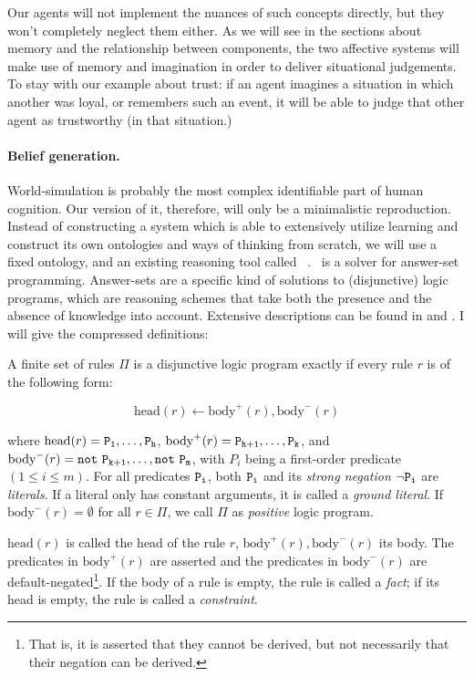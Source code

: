 Our agents will not implement the nuances of such concepts directly, but they won't completely neglect them either. As we will see in the sections about memory and the relationship between components, the two affective systems will make use of memory and imagination in order to deliver situational judgements. To stay with our example about trust: if an agent imagines a situation in which another was loyal, or remembers such an event, it will be able to judge that other agent as trustworthy (in that situation.)

\paragraph{Belief generation.} World-simulation is probably the most complex identifiable part of human cognition. Our version of it, therefore, will only be a minimalistic reproduction. Instead of constructing a system which is able to extensively utilize learning and construct its own ontologies and ways of thinking from scratch, we will use a fixed ontology, and an existing reasoning tool called \dlvhex\ \cite{dlvhex}. \dlvhex\ is a solver for answer-set programming. Answer-sets are a specific kind of solutions to (disjunctive) logic programs, which are reasoning schemes that take both the presence and the absence of knowledge into account. Extensive descriptions can be found in \cite{lifschitz2008} and \cite{baral2003}. I will give the compressed definitions:

\begin{definition}
	A finite set of rules $\Pi$ is a disjunctive logic program exactly if every rule $r$ is of the following form:
	
	$$
		\mathrm{head}(r) \leftarrow \mathrm{body}^+(r), \mathrm{body}^-(r)
	$$
	
	where $\mathrm{head}(r) = \mathtt{P_1},\dots,\mathtt{P_h}$, $\mathrm{body}^+(r) = \mathtt{P_{h+1}},\dots,\mathtt{P_k}$, and $\mathrm{body}^-(r) = \field{not\ P_{k+1}},\dots,\field{not\ P_m}$, with $P_i$ being a first-order predicate $(1\leq i \leq m)$. For all predicates $\mathtt{P_i}$, both $\mathtt{P_i}$ and its {\em strong negation} $\neg \mathtt{P_i}$ are {\em literals}. If a literal only has constant arguments, it is called a {\em ground literal}.
	If $\mathrm{body}^-(r) = \emptyset$ for all $r \in \Pi$, we call $\Pi$ as {\em positive} logic program.
	
	
	
	$\mathrm{head}(r) $ is called the head of the rule $r$, $\mathrm{body}^+(r),\mathrm{body}^-(r)$ its body. The predicates in $\mathrm{body}^+(r)$ are asserted and the predicates in $\mathrm{body}^-(r) $ are default-negated\footnote{That is, it is asserted that they cannot be derived, but not necessarily that their negation can be derived.}. If the body of a rule is empty, the rule is called a {\em fact}; if its head is empty, the rule is called a {\em constraint}.
\end{definition}

